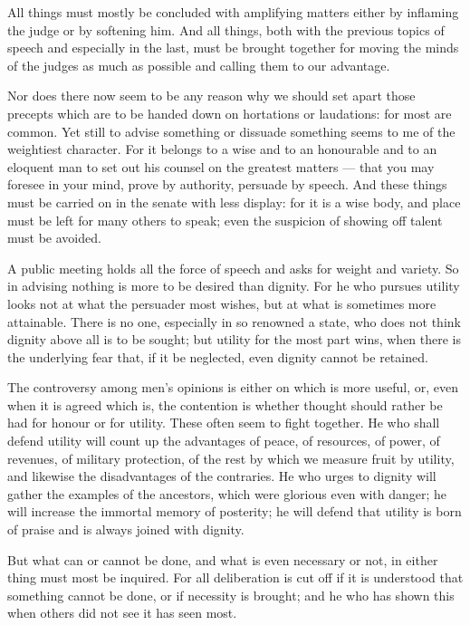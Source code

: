  All things must mostly be concluded with amplifying matters either by inflaming the judge or by softening him. And all things, both with the previous topics of speech and especially in the last, must be brought together for moving the minds of the judges as much as possible and calling them to our advantage.

 Nor does there now seem to be any reason why we should set apart those precepts which are to be handed down on hortations or laudations: for most are common. Yet still to advise something or dissuade something seems to me of the weightiest character. For it belongs to a wise and to an honourable and to an eloquent man to set out his counsel on the greatest matters — that you may foresee in your mind, prove by authority, persuade by speech. And these things must be carried on in the senate with less display: for it is a wise body, and place must be left for many others to speak; even the suspicion of showing off talent must be avoided.

 A public meeting holds all the force of speech and asks for weight and variety. So in advising nothing is more to be desired than dignity. For he who pursues utility looks not at what the persuader most wishes, but at what is sometimes more attainable. There is no one, especially in so renowned a state, who does not think dignity above all is to be sought; but utility for the most part wins, when there is the underlying fear that, if it be neglected, even dignity cannot be retained.

 The controversy among men's opinions is either on which is more useful, or, even when it is agreed which is, the contention is whether thought should rather be had for honour or for utility. These often seem to fight together. He who shall defend utility will count up the advantages of peace, of resources, of power, of revenues, of military protection, of the rest by which we measure fruit by utility, and likewise the disadvantages of the contraries. He who urges to dignity will gather the examples of the ancestors, which were glorious even with danger; he will increase the immortal memory of posterity; he will defend that utility is born of praise and is always joined with dignity.

 But what can or cannot be done, and what is even necessary or not, in either thing must most be inquired. For all deliberation is cut off if it is understood that something cannot be done, or if necessity is brought; and he who has shown this when others did not see it has seen most.

